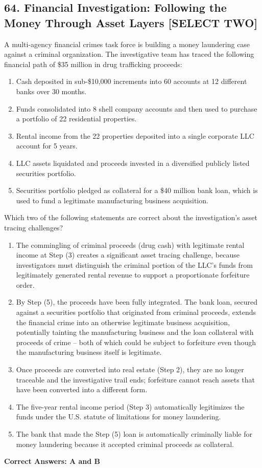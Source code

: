 \documentclass[11pt,a4paper]{article}
\begin{document}
	\subsection{64. Financial Investigation: Following the Money Through Asset Layers \textnormal{[SELECT TWO]}}
	
	A multi-agency financial crimes task force is building a money laundering case against a criminal organization. The investigative team has traced the following financial path of \$35 million in drug trafficking proceeds:
	
	\begin{enumerate}
		\item Cash deposited in sub-\$10,000 increments into 60 accounts at 12 different banks over 30 months.
		\item Funds consolidated into 8 shell company accounts and then used to purchase a portfolio of 22 residential properties.
		\item Rental income from the 22 properties deposited into a single corporate LLC account for 5 years.
		\item LLC assets liquidated and proceeds invested in a diversified publicly listed securities portfolio.
		\item Securities portfolio pledged as collateral for a \$40 million bank loan, which is used to fund a legitimate manufacturing business acquisition.
	\end{enumerate}
	
	Which two of the following statements are correct about the investigation's asset tracing challenges?
	
	\begin{enumerate}[label=\Alph*.]
		\item The commingling of criminal proceeds (drug cash) with legitimate rental income at Step (3) creates a significant asset tracing challenge, because investigators must distinguish the criminal portion of the LLC's funds from legitimately generated rental revenue to support a proportionate forfeiture order.
		\item By Step (5), the proceeds have been fully integrated. The bank loan, secured against a securities portfolio that originated from criminal proceeds, extends the financial crime into an otherwise legitimate business acquisition, potentially tainting the manufacturing business and the loan collateral with proceeds of crime -- both of which could be subject to forfeiture even though the manufacturing business itself is legitimate.
		\item Once proceeds are converted into real estate (Step 2), they are no longer traceable and the investigative trail ends; forfeiture cannot reach assets that have been converted into a different form.
		\item The five-year rental income period (Step 3) automatically legitimizes the funds under the U.S. statute of limitations for money laundering.
		\item The bank that made the Step (5) loan is automatically criminally liable for money laundering because it accepted criminal proceeds as collateral.
	\end{enumerate}
	\textbf{Correct Answers: A and B}
	
\end{document}
